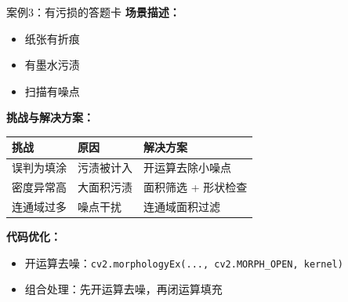 \begin{frame}{案例3：有污损的答题卡}
    \textbf{场景描述：}
    \begin{itemize}
        \item 纸张有折痕
        \item 有墨水污渍
        \item 扫描有噪点
    \end{itemize}

    \vspace{0.3cm}

    \textbf{挑战与解决方案：}
    \begin{table}
        \centering
        \begin{tabular}{l|l|l}
        \toprule
        挑战 & 原因 & 解决方案 \\
        \midrule
        误判为填涂 & 污渍被计入 & 开运算去除小噪点 \\
        密度异常高 & 大面积污渍 & 面积筛选 + 形状检查 \\
        连通域过多 & 噪点干扰 & 连通域面积过滤 \\
        \bottomrule
        \end{tabular}
    \end{table}

    \textbf{代码优化：}
    \begin{itemize}
        \item 开运算去噪：\texttt{cv2.morphologyEx(..., cv2.MORPH\_OPEN, kernel)}
        \item 组合处理：先开运算去噪，再闭运算填充
    \end{itemize}
\end{frame}

